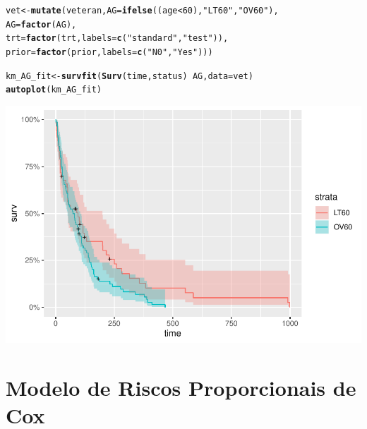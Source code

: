 \documentclass[a4paper, oneside]{book}\usepackage[]{graphicx}\usepackage[]{color}
\makeatletter
\def\maxwidth{ %
  \ifdim\Gin@nat@width>\linewidth
    \linewidth
  \else
    \Gin@nat@width
  \fi
}
\newcommand{\hlnum}[1]{\textcolor[rgb]{0.686,0.059,0.569}{#1}}%
\newcommand{\hlstr}[1]{\textcolor[rgb]{0.192,0.494,0.8}{#1}}%
\newcommand{\hlopt}[1]{\textcolor[rgb]{0,0,0}{#1}}%
\newcommand{\hlstd}[1]{\textcolor[rgb]{0.345,0.345,0.345}{#1}}%
\newcommand{\hlkwb}[1]{\textcolor[rgb]{0.69,0.353,0.396}{#1}}%
\newcommand{\hlkwc}[1]{\textcolor[rgb]{0.333,0.667,0.333}{#1}}%
\newcommand{\hlkwd}[1]{\textcolor[rgb]{0.737,0.353,0.396}{\textbf{#1}}}%
\newenvironment{kframe}{%
 \def\at@end@of@kframe{}%
 \ifinner\ifhmode%
  \def\at@end@of@kframe{\end{minipage}}%
  \begin{minipage}{\columnwidth}%
 \fi\fi%
 \def\FrameCommand##1{\hskip\@totalleftmargin \hskip-\fboxsep
 \colorbox{shadecolor}{##1}\hskip-\fboxsep
     \hskip-\linewidth \hskip-\@totalleftmargin \hskip\columnwidth}%
 \MakeFramed {\advance\hsize-\width
   \@totalleftmargin\z@ \linewidth\hsize
   \@setminipage}}%
 {\par\unskip\endMakeFramed%
 \at@end@of@kframe}
\newenvironment{knitrout}{}{} %
\makeatother
\begin{document}
\begin{knitrout}
\color{fgcolor}\begin{kframe}
\begin{alltt}
\hlstd{vet} \hlkwb{<-} \hlkwd{mutate}\hlstd{(veteran,} \hlkwc{AG} \hlstd{=} \hlkwd{ifelse}\hlstd{((age} \hlopt{<} \hlnum{60}\hlstd{),} \hlstr{"LT60"}\hlstd{,} \hlstr{"OV60"}\hlstd{),}
              \hlkwc{AG} \hlstd{=} \hlkwd{factor}\hlstd{(AG),}
              \hlkwc{trt} \hlstd{=} \hlkwd{factor}\hlstd{(trt,}\hlkwc{labels}\hlstd{=}\hlkwd{c}\hlstd{(}\hlstr{"standard"}\hlstd{,}\hlstr{"test"}\hlstd{)),}
              \hlkwc{prior} \hlstd{=} \hlkwd{factor}\hlstd{(prior,}\hlkwc{labels}\hlstd{=}\hlkwd{c}\hlstd{(}\hlstr{"N0"}\hlstd{,}\hlstr{"Yes"}\hlstd{)))}

\hlstd{km_AG_fit} \hlkwb{<-} \hlkwd{survfit}\hlstd{(}\hlkwd{Surv}\hlstd{(time, status)} \hlopt{~} \hlstd{AG,} \hlkwc{data}\hlstd{=vet)}
\hlkwd{autoplot}\hlstd{(km_AG_fit)}
\end{alltt}
\end{kframe}

{\centering \includegraphics[width=\maxwidth]{figure/script5-1} 

}



\end{knitrout}



      
      
      
      
      \section{Modelo de Riscos Proporcionais de Cox}
      
\end{document}
